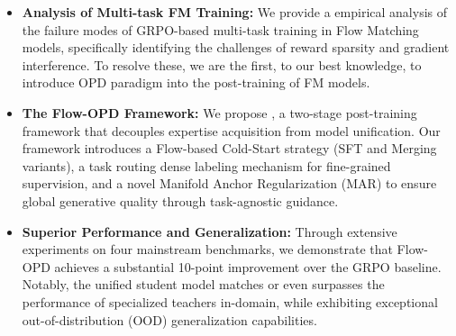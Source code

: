 \begin{itemize}
    \vspace{-0.2cm}
    \item \textbf{Analysis of Multi-task FM Training:} We provide a empirical  analysis of the failure modes of GRPO-based multi-task training in Flow Matching models, specifically identifying the challenges of reward sparsity and gradient interference. To resolve these, we are the first, to our best knowledge, to introduce OPD paradigm into the post-training of FM models.
    \item \textbf{The Flow-OPD Framework:} We propose , a two-stage post-training framework that decouples expertise acquisition from model unification. Our framework introduces a Flow-based Cold-Start strategy (SFT and Merging variants), a task routing dense labeling mechanism for fine-grained supervision, and a novel Manifold Anchor Regularization (MAR) to ensure global generative quality through task-agnostic guidance.
    \item \textbf{Superior Performance and Generalization:} Through extensive experiments on four mainstream benchmarks, we demonstrate that Flow-OPD achieves a substantial 10-point improvement over the GRPO baseline. Notably, the unified student model matches or even surpasses the performance of specialized teachers in-domain, while exhibiting exceptional out-of-distribution (OOD) generalization capabilities.
\end{itemize}


